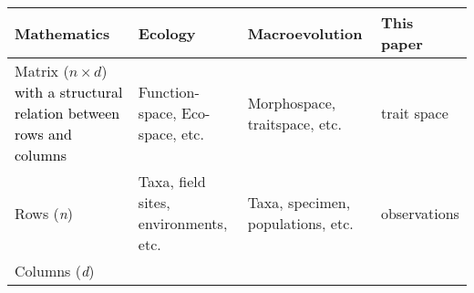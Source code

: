 \documentclass[]{article}
\begin{document}
\begin{longtable}[]{llll}
\toprule
\begin{minipage}[b]{0.2111\columnwidth}\raggedright\strut
Mathematics\strut
\end{minipage} & \begin{minipage}[b]{0.2111\columnwidth}\raggedright\strut
Ecology\strut
\end{minipage} & \begin{minipage}[b]{0.2111\columnwidth}\raggedright\strut
Macroevolution\strut
\end{minipage} & \begin{minipage}[b]{0.2111\columnwidth}\raggedright\strut
This paper\strut
\end{minipage}\tabularnewline
\midrule
\endhead
\begin{minipage}[t]{0.2111\columnwidth}\raggedright\strut
Matrix (\(n \times d\))
\textcolor{black}{with a structural relation between rows and columns}\strut
\end{minipage} & \begin{minipage}[t]{0.2111\columnwidth}\raggedright\strut
Function-space, Eco-space, etc.\strut
\end{minipage} & \begin{minipage}[t]{0.2111\columnwidth}\raggedright\strut
Morphospace, traitspace, etc.\strut
\end{minipage} & \begin{minipage}[t]{0.2111\columnwidth}\raggedright\strut
trait space\strut
\end{minipage}\tabularnewline
\begin{minipage}[t]{0.2111\columnwidth}\raggedright\strut
Rows (\emph{n})\strut
\end{minipage} & \begin{minipage}[t]{0.2111\columnwidth}\raggedright\strut
Taxa, field sites, environments, etc.\strut
\end{minipage} & \begin{minipage}[t]{0.2111\columnwidth}\raggedright\strut
Taxa, specimen, populations, etc.\strut
\end{minipage} & \begin{minipage}[t]{0.2111\columnwidth}\raggedright\strut
observations\strut
\end{minipage}\tabularnewline
\begin{minipage}[t]{0.2111\columnwidth}\raggedright\strut
Columns (\emph{d})\strut
\end{minipage} & \begin{minipage}[t]{0.2111\columnwidth}\raggedright\strut

\end{minipage}
\end{longtable}
\end{document}
